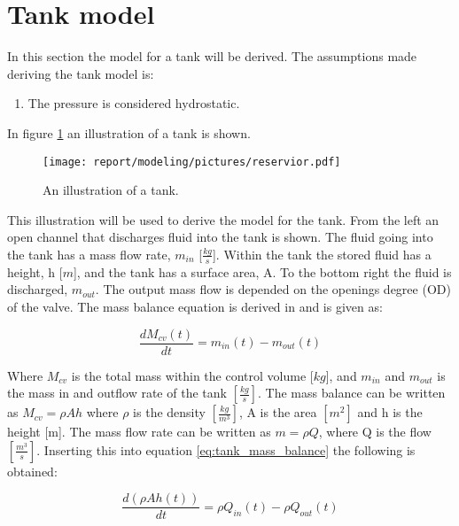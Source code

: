 \section{Tank model}\label{se:sewer_reservoir}
In this section the model for a tank will be derived. 
The assumptions made deriving the tank model is:
\begin{table}[H]
\begin{enumerate}
\item The pressure is considered hydrostatic.
\end{enumerate}
\end{table}

In figure \ref{fig:tank_model} an illustration of a tank is shown.
\begin{figure}[H]
\centering
\texttt{[image: report/modeling/pictures/reservior.pdf]}
\caption{An illustration of a tank.}
\label{fig:tank_model}
\end{figure} 

This illustration will be used to derive the model for the tank. From the left an open channel that discharges fluid into the tank is shown. The fluid going into the tank has a mass flow rate, $m_{in}$ [$\frac{kg}{s}$]. Within the tank the stored fluid has a height, h [$m$], and the tank has a surface area, A. To the bottom right the fluid is discharged, $m_{out}$. The output mass flow is depended on the openings degree (OD) of the valve. The mass balance equation is derived in \cite{model_tank} and is given as:


\begin{equation}
	 	\frac{dM_{cv}(t)}{dt}=m_{in}(t)-m_{o ut}(t)
\label{eq:tank_mass_balance}
\end{equation} 

Where $M_{cv}$ is the total mass within the control volume [$kg$], and $m_{in}$ and $m_{out}$ is the mass in and outflow rate of the tank $\left[\frac{kg}{s}\right]$. The mass balance can be written as $M_{cv} = \rho Ah$ where $\rho$ is the density $\left[\frac{kg}{m^3}\right]$, A is the area $\left[m^2\right]$ and h is the height [m]. The mass flow rate can be written as $m = \rho Q$, where Q is the flow $\left[\frac{m^3}{s}\right]$. Inserting this into equation \ref{eq:tank_mass_balance} the following is obtained:

\begin{equation}
		\frac{d(\rho Ah(t))}{dt}=\rho Q_{in}(t)-\rho Q_{out}(t)
\end{equation}

